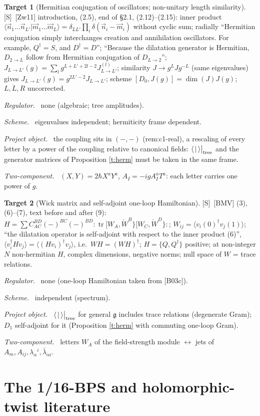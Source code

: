 \documentclass[11pt]{article}
\theoremstyle{definition}
\newtheorem{target}{Target}
\newcommand{\tr}{\operatorname{tr}}
\newcommand{\Sl}{\textup{[S]}}
\newcommand{\tree}{\big|_{\rm tree}}
\newcommand{\fld}[1]{\par\textit{#1.}\ }
\begin{document}
\begin{target}[Hermitian conjugation of oscillators; non-unitary length similarity]\label{t:zw}
\Sl\ [Zw11] introduction, (2.5), end of \S2.1, (2.12)--(2.15): inner product $\langle\vec n_1\dots\vec n_{L'}|\vec m_1\dots\vec m_L\rangle=\delta_{LL'}\prod_i\delta(\vec n_i-\vec m_i)$ without cyclic sum; radially ``Hermitian conjugation simply interchanges creation and annihilation oscillators. For example, $Q^\dagger=S$, and $D^\dagger=D$''; ``Because the dilatation generator is Hermitian, $D_{2\to L}$ follow from Hermitian conjugation of $D_{L\to2}$''; $J_{L\to L'}(g)=\sum_lg^{L+L'+2l-2}J^{(l)}_{L\to L'}$; similarity $J\to g^LJg^{-L}$ (same eigenvalues) gives $J_{L\to L'}(g)=g^{2L'-2}J_{L\to L'}$; scheme $[D_0,J(g)]=\dim(J)J(g)$; $L,\dot L,R$ uncorrected.
\fld{Regulator} none (algebraic; tree amplitudes). \fld{Scheme} eigenvalues independent; hermiticity frame dependent.
\fld{Project object} the coupling sits in $(-,-)$ (rem:c1-real), a rescaling of every letter by a power of the coupling relative to canonical fields: $\langle\,|\,\rangle\tree$ and the generator matrices of Proposition \ref{t:herm} must be taken in the same frame.
\fld{Two-component} $(X,Y)=2\hbar X^aY^a$, $A_I=-igA^a_IT^a$: each letter carries one power of $g$.
\end{target}

\begin{target}[Wick matrix and self-adjoint one-loop Hamiltonian]\label{t:bmv}
\Sl\ [BMV] (3), (6)--(7), text before and after (9): $H=\sum C^{BD}_{AC}(-)^{BC}(-)^{BD}:\tr[W_A,\check W^B\}[W_C,\check W^D\}:$; $W_{ij}=\langle v_i(0)^\dagger v_j(1)\rangle$; ``the dilatation operator is self-adjoint with respect to the inner product (6)'', $\langle v_i^\dagger Hv_j\rangle=\langle(Hv_i)^\dagger v_j\rangle$, i.e.\ $WH=(WH)^\dagger$; $H=\{Q,Q^\dagger\}$ positive; at non-integer $N$ non-hermitian $H$, complex dimensions, negative norms; null space of $W$ = trace relations.
\fld{Regulator} none (one-loop Hamiltonian taken from [B03c]).
\fld{Scheme} independent (spectrum).
\fld{Project object} $\langle\,|\,\rangle\tree$ for general $\mathfrak g$ includes trace relations (degenerate Gram); $D_1$ self-adjoint for it (Proposition \ref{t:herm} with commuting one-loop Gram).
\fld{Two-component} letters $W_A$ of the field-strength module $\leftrightarrow$ jets of $A_m,A_{ij},\lambda_\alpha{}^i,\bar\lambda_{\dot\alpha i}$.
\end{target}

\section{The 1/16-BPS and holomorphic-twist literature}
\end{document}
